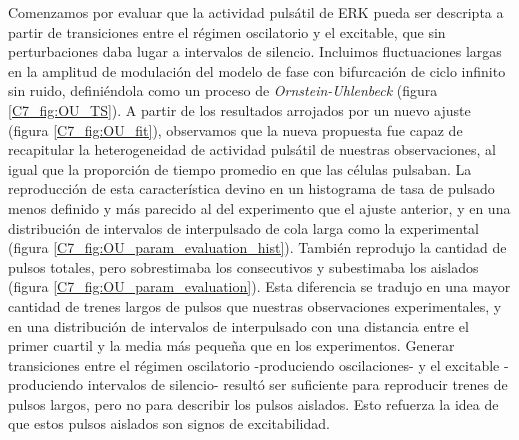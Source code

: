 \documentclass[./main.tex]{subfiles}
\begin{document}
Comenzamos por evaluar que la actividad pulsátil de ERK pueda ser descripta a partir de transiciones entre el régimen oscilatorio y el excitable, que sin perturbaciones daba lugar a intervalos de silencio. Incluimos fluctuaciones largas en la amplitud de modulación del modelo de fase con bifurcación de ciclo infinito sin ruido, definiéndola como un proceso de \textit{Ornstein-Uhlenbeck} (figura \ref{C7_fig:OU_TS}). A partir de los resultados arrojados por un nuevo ajuste (figura  \ref{C7_fig:OU_fit}), observamos que la nueva propuesta fue capaz de recapitular la heterogeneidad de actividad pulsátil de nuestras observaciones, al igual que la proporción de tiempo promedio en que las células pulsaban. La reproducción de esta característica devino en un histograma de tasa de pulsado menos definido y más parecido al del experimento que el ajuste anterior, y en una distribución de intervalos de interpulsado de cola larga como la experimental (figura \ref{C7_fig:OU_param_evaluation_hist}). También reprodujo la cantidad de pulsos totales, pero sobrestimaba los consecutivos y subestimaba los aislados (figura \ref{C7_fig:OU_param_evaluation}). Esta diferencia se tradujo en una mayor cantidad de trenes largos de pulsos que nuestras observaciones experimentales, y en una distribución de intervalos de interpulsado con una distancia entre el primer cuartil y la media más pequeña que en los experimentos. Generar transiciones entre el régimen oscilatorio -produciendo oscilaciones- y el excitable -produciendo intervalos de silencio- resultó ser suficiente para reproducir trenes de pulsos largos, pero no para describir los pulsos aislados. Esto refuerza la idea de que estos pulsos aislados son signos de excitabilidad.
\end{document}
